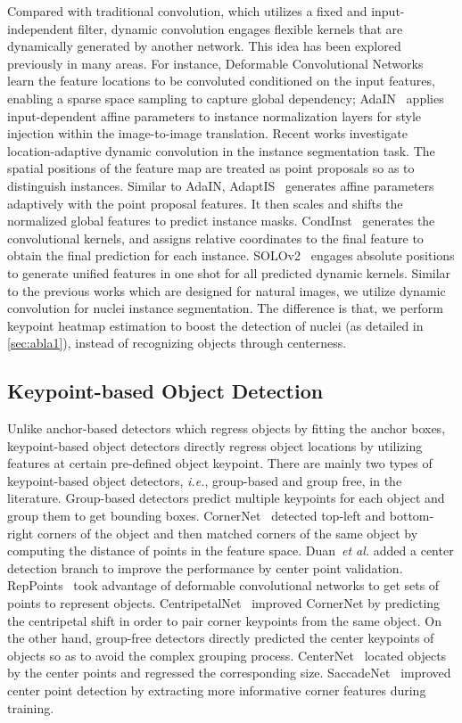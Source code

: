 \documentclass[lettersize,journal]{IEEEtran}
\newcommand{\etal}{{\textit{et al.}}}
\newcommand{\ie}{{\textit{i.e.}}, }
\begin{document}
Compared with traditional convolution, which utilizes a fixed and input-independent filter, dynamic convolution engages flexible kernels that are dynamically generated by another network. This idea has been explored previously in many areas. For instance,  Deformable Convolutional Networks~\cite{zhu2019deformable} learn the feature locations to be convoluted conditioned on the input features, enabling a sparse space sampling to capture global dependency; AdaIN~\cite{adain} applies input-dependent affine parameters to instance normalization layers for style injection within the image-to-image translation. Recent works investigate location-adaptive dynamic convolution in the instance segmentation task. The spatial positions of the feature map are treated as point proposals so as to distinguish instances. Similar to AdaIN, AdaptIS~\cite{Sofiiuk_2019_ICCV} generates affine parameters adaptively with the point proposal features. It then scales and shifts the normalized global features to predict instance masks. CondInst~\cite{condinst} generates the convolutional kernels, and assigns relative coordinates to the final feature to obtain the final prediction for each instance. SOLOv2~\cite{solov2} engages absolute positions to generate unified features in one shot for all predicted dynamic kernels. Similar to the previous works which are designed for natural images, we utilize dynamic convolution for nuclei instance segmentation. The difference is that, we perform keypoint heatmap estimation to boost the detection of nuclei (as detailed in \autoref{sec:abla1}), instead of recognizing objects through centerness.


\subsection{Keypoint-based Object Detection}
Unlike anchor-based detectors which regress objects by fitting the anchor boxes, keypoint-based object detectors directly regress object locations by utilizing features at certain pre-defined object keypoint. There are mainly two types of keypoint-based object detectors, \ie group-based  and group free, in the literature. Group-based detectors predict multiple keypoints for each object and group them to get bounding boxes. CornerNet~\cite{Cornernet} detected top-left and bottom-right corners of the object and then matched corners of the same object by computing the distance of points in the feature space. Duan~\etal\cite{duan2019centernet} added a center detection branch to improve the performance by center point validation. RepPoints~\cite{reppoints} took advantage of deformable convolutional networks to get sets of points to represent objects. CentripetalNet~\cite{centripetalnet} improved CornerNet by predicting the centripetal shift in order to pair corner keypoints from the same object. On the other hand, group-free detectors directly predicted the center keypoints of objects so as to avoid the complex grouping process. CenterNet~\cite{CenterNet} located objects by the center points and regressed the corresponding size. SaccadeNet~\cite{saccadenet} improved center point detection by extracting more informative corner features during training.
\end{document}
